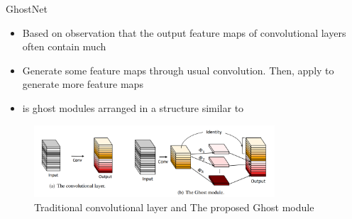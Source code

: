 \documentclass{cubeamer}
\begin{document}
\begin{frame}{GhostNet \cite{ghostnet}}
    \begin{itemize}
        \item Based on observation that the output feature maps of convolutional layers often contain much 
        \item Generate some feature maps through usual convolution. Then, apply  to generate more feature maps
        \item {} is ghost modules arranged in a structure similar to 
    \end{itemize}
    \begin{figure}
        \centering
        \includegraphics[width=0.8\textwidth]{figures/ghost_net.png}
        \caption{Traditional convolutional layer and The proposed Ghost module \cite{ghostnet}}
    \end{figure}
\end{frame}
\end{document}
